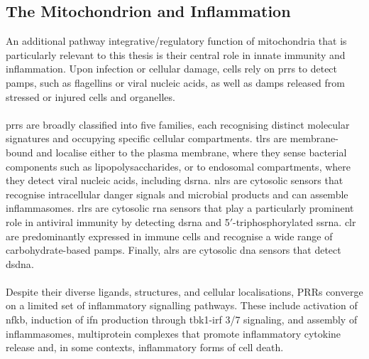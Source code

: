 \subsection{The Mitochondrion and Inflammation}

An additional pathway integrative/regulatory function of mitochondria that is particularly relevant to this thesis is their central role in innate immunity and inflammation. Upon infection or cellular damage, cells rely on \glspl{prr} to detect \glspl{pamp}, such as flagellins or viral nucleic acids, as well as \glspl{damp} released from stressed or injured cells and organelles\cite{harrington_mitochondria_2023, andrieux_mitochondria_2021, li_pattern_2021}.
\\
\\
\glspl{prr} are broadly classified into five families, each recognising distinct molecular signatures and occupying specific cellular compartments\cite{li_pattern_2021}. \Glspl{tlr} are membrane-bound and localise either to the plasma membrane, where they sense bacterial components such as lipopolysaccharides, or to endosomal compartments, where they detect viral nucleic acids, including \gls{dsrna}\cite{li_pattern_2021}. \Glspl{nlr} are cytosolic sensors that recognise intracellular danger signals and microbial products and can assemble inflammasomes\cite{li_pattern_2021}. \Glspl{rlr} are cytosolic \gls{rna} sensors that play a particularly prominent role in antiviral immunity by detecting \gls{dsrna} and 5$'$-triphosphorylated \gls{ssrna}\cite{harrington_mitochondria_2023, andrieux_mitochondria_2021, li_pattern_2021}. \gls{clr} are predominantly expressed in immune cells and recognise a wide range of carbohydrate-based \glspl{pamp}. Finally, \glspl{alr} are cytosolic \gls{dna} sensors that detect \gls{dsdna}\cite{li_pattern_2021}.
\\
\\
Despite their diverse ligands, structures, and cellular localisations, PRRs converge on a limited set of inflammatory signalling pathways\cite{andrieux_mitochondria_2021, li_pattern_2021}. These include activation of \gls{nfkb}, induction of \gls{ifn} production through \gls{tbk1}-\gls{irf} 3/7 signaling, and assembly of inflammasomes, multiprotein complexes that promote inflammatory cytokine release and, in some contexts, inflammatory forms of cell death\cite{li_pattern_2021}.
\\
\\

